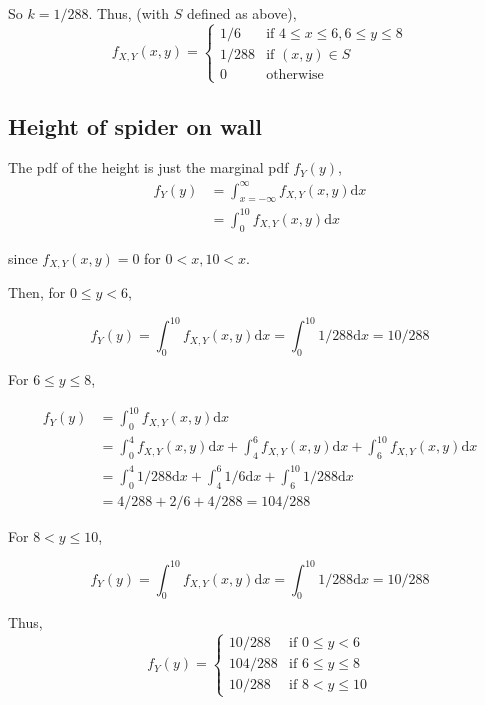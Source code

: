 \documentclass[paper=a4, fontsize=11pt]{scrartcl} %
\numberwithin{equation}{section} %
\numberwithin{figure}{section} %
\numberwithin{table}{section} %
\begin{document}
So $k = 1/288$. Thus, (with $S$ defined as above), 
\[ 
f_{X,Y}(x,y) = 
	\begin{cases}
		1/6 & \textrm{if } 4 \leq x \leq 6, 6 \leq y \leq 8 \\
		1/288 & \textrm{if } (x,y) \in S\\
		0 & \textrm{otherwise}
	\end{cases}
\]

\subsection{Height of spider on wall}
The pdf of the height is just the marginal pdf $f_{Y}(y)$,
\begin{align*}
f_{Y}(y) &= \int_{x=-\infty}^\infty f_{X, Y}(x,y) \textrm{d}x \\
   &= \int_0^{10} f_{X, Y} (x,y) \textrm{d}x
\end{align*}

since $f_{X, Y}(x,y) = 0$ for $0<x, 10<x$.

Then, for $0 \leq y < 6$,

\begin{equation*}
f_Y(y) = \int_0^{10} f_{X, Y}(x,y) \textrm{d}x =  \int_0^{10} 1/288 \textrm{d}x = 10/288
\end{equation*}

For $6 \leq y \leq 8$,

\begin{align*}
f_Y(y) &= \int_0^{10} f_{X, Y}(x,y) \textrm{d}x\\
   &= \int_0^4 f_{X, Y}(x,y) \textrm{d}x + \int_4^6 f_{X, Y}(x,y) \textrm{d}x +\int_6^{10} f_{X, Y}(x,y) \textrm{d}x  \\
      &= \int_0^4 1/288 \textrm{d}x + \int_4^6 1/6 \textrm{d}x +\int_6^{10} 1/288 \textrm{d}x  \\
      &= 4/288 + 2/6 + 4/288 = 104/288
\end{align*}

For $8 < y \leq 10$,

\begin{equation*}
f_Y(y) = \int_0^{10} f_{X, Y}(x,y) \textrm{d}x =  \int_0^{10} 1/288 \textrm{d}x = 10/288
\end{equation*}

Thus,
\[ 
f_Y(y) = 
	\begin{cases}
		10/288 & \textrm{if } 0 \leq y <6 \\
		104/288 & \textrm{if } 6 \leq y \leq 8\\
		10/288 & \textrm{if } 8 < y \leq 10
	\end{cases}
\]
\end{document}

